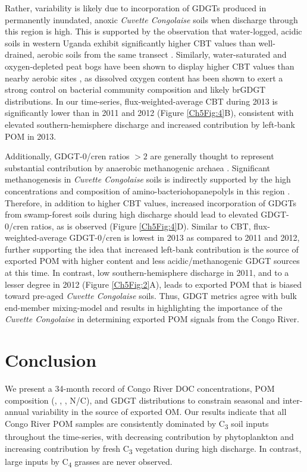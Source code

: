 Rather, variability is likely due to incorporation of GDGTs produced in permanently inundated, anoxic \textit{Cuvette Congolaise} soils when discharge through this region is high. This is supported by the observation that water-logged, acidic soils in western Uganda exhibit significantly higher CBT values than well-drained, aerobic soils from the same transect \citep{Loomis:2011dr}. Similarly, water-saturated and oxygen-depleted peat bogs have been shown to display higher CBT values than nearby aerobic sites \citep{Huguet:2010di}, as dissolved oxygen content has been shown to exert a strong control on bacterial community composition \citep{Hansel:2008hp} and likely brGDGT distributions. In our time-series, flux-weighted-average CBT during 2013 is significantly lower than in 2011 and 2012 (Figure \ref{Ch5Fig:4}B), consistent with elevated southern-hemisphere discharge and increased contribution by left-bank POM in 2013.

Additionally, GDGT-0/cren ratios $>2$ are generally thought to represent substantial contribution by anaerobic methanogenic archaea \citep{Blaga:2009ge}. Significant methanogenesis in \textit{Cuvette Congolaise} soils is indirectly supported by the high concentrations and  composition of amino-bacteriohopanepolyls in this region \citep{Talbot:2014jd,SpencerJones:2015bn}. Therefore, in addition to higher CBT values, increased incorporation of GDGTs from swamp-forest soils during high discharge should lead to elevated GDGT-0/cren ratios, as is observed (Figure \ref{Ch5Fig:4}D). Similar to CBT, flux-weighted-average GDGT-0/cren is lowest in 2013 as compared to 2011 and 2012, further supporting the idea that increased left-bank contribution is the source of exported POM with higher  content and less acidic/methanogenic GDGT sources at this time. In contrast, low southern-hemisphere discharge in 2011, and to a lesser degree in 2012 (Figure \ref{Ch5Fig:2}A), leads to exported POM that is biased toward pre-aged \textit{Cuvette Congolaise} soils. Thus, GDGT metrics agree with bulk end-member mixing-model and  results in highlighting the importance of the \textit{Cuvette Congolaise} in determining exported POM signals from the Congo River.

\section{Conclusion}

We present a 34-month record of Congo River DOC concentrations, POM composition (, , , N/C), and GDGT distributions to constrain seasonal and inter-annual variability in the source of exported OM. Our results indicate that all Congo River POM samples are consistently dominated by C\textsubscript{3} soil inputs throughout the time-series, with decreasing contribution by phytoplankton and increasing contribution by fresh C\textsubscript{3} vegetation during high discharge. In contrast, large inputs by C\textsubscript{4} grasses are never observed.

